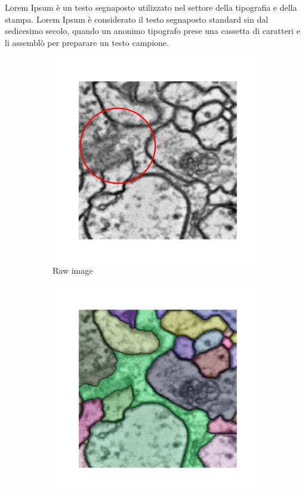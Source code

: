 Lorem Ipsum è un testo segnaposto utilizzato nel settore della tipografia e della stampa. Lorem Ipsum è considerato il testo segnaposto standard sin dal sedicesimo secolo, quando un anonimo tipografo prese una cassetta di caratteri e li assemblò per preparare un testo campione.
\begin{figure}[t]
\begin{subfigure}[t]{0.47\linewidth}
\centering
\includegraphics[width=0.75\linewidth,trim=1.50in 1.4in 1.4in 1.50in,clip]{./figs/affs_compare/raw_mod.pdf} %
\caption{\centering Raw image}
\end{subfigure}\hfill
\begin{subfigure}[t]{0.47\textwidth}
\centering
\includegraphics[width=0.75\linewidth,trim=1.50in 1.4in 1.4in 1.50in,clip]{./figs/affs_compare/GT.pdf} %

\end{subfigure}
\end{figure}
